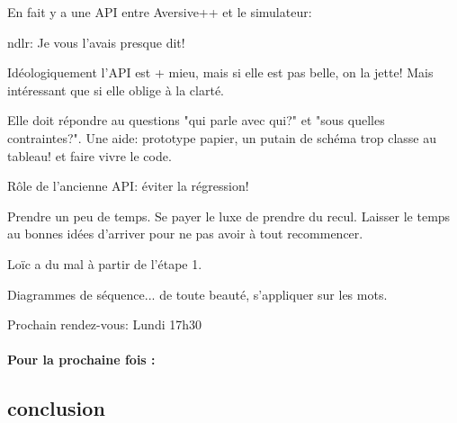 \documentclass[a4paper,10pt]{article}
\begin{document}
En fait y a une API entre Aversive++ et le simulateur:

ndlr: Je vous l'avais presque dit!

Idéologiquement l'API est + mieu, mais si elle est pas belle, on la jette! Mais intéressant que si elle oblige à la clarté.

Elle doit répondre au questions "qui parle avec qui?" et "sous quelles contraintes?". Une aide: prototype papier, un putain de schéma trop classe au tableau! et faire vivre le code.

Rôle de l'ancienne API: éviter la régression!

Prendre un peu de temps. Se payer le luxe de prendre du recul. Laisser le temps au bonnes idées d'arriver pour ne pas avoir à tout recommencer.

Loïc a du mal à partir de l'étape 1.

Diagrammes de séquence... de toute beauté, s'appliquer sur les mots.

Prochain rendez-vous: Lundi 17h30
\paragraph{Pour la prochaine fois :}
\subsection*{conclusion}
\end{document}
